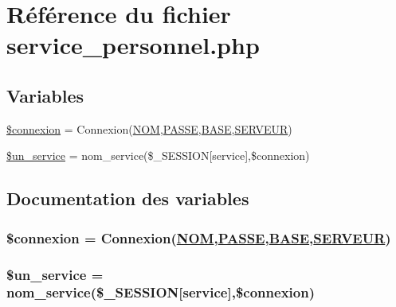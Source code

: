 \hypertarget{service__personnel_8php}{
\section{R\'{e}f\'{e}rence du fichier service\_\-personnel.php}
\label{service__personnel_8php}
}
\subsection*{Variables}
\begin{CompactItemize}
\item 
\hyperlink{service__personnel_8php_a0}{\$connexion} = Connexion(\hyperlink{pma__connect_8php_a0}{NOM},\hyperlink{pma__connect_8php_a1}{PASSE},\hyperlink{pma__connect_8php_a3}{BASE},\hyperlink{pma__connect_8php_a2}{SERVEUR})
\item 
\hyperlink{service__personnel_8php_a1}{\$un\_\-service} = nom\_\-service(\$\_\-SESSION\mbox{[}service\mbox{]},\$connexion)
\end{CompactItemize}


\subsection{Documentation des variables}
\hypertarget{service__personnel_8php_a0}{
\subsubsection[\$connexion]{\setlength{\rightskip}{0pt plus 5cm}\$connexion = Connexion(\hyperlink{pma__connect_8php_a0}{NOM},\hyperlink{pma__connect_8php_a1}{PASSE},\hyperlink{pma__connect_8php_a3}{BASE},\hyperlink{pma__connect_8php_a2}{SERVEUR})}}
\label{service__personnel_8php_a0}


\hypertarget{service__personnel_8php_a1}{
\subsubsection[\$un\_\-service]{\setlength{\rightskip}{0pt plus 5cm}\$un\_\-service = nom\_\-service(\$\_\-SESSION\mbox{[}service\mbox{]},\$connexion)}}
\label{service__personnel_8php_a1}



